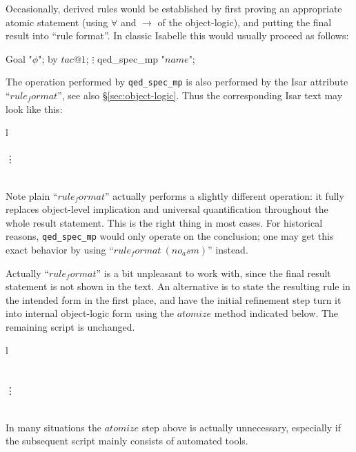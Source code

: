 \medskip Occasionally, derived rules would be established by first proving an
appropriate atomic statement (using $\forall$ and $\longrightarrow$ of the
object-logic), and putting the final result into ``rule format''.  In classic
Isabelle this would usually proceed as follows:
\begin{ttbox}
 Goal "\(\phi\)";
 by \(tac@1\);
   \(\vdots\)
 qed_spec_mp "\(name\)";
\end{ttbox}
The operation performed by \texttt{qed_spec_mp} is also performed by the Isar
attribute ``$rule_format$'', see also \S\ref{sec:object-logic}.  Thus the
corresponding Isar text may look like this:
\begin{matharray}{l}
   \\
  \quad {} \\
  \qquad \vdots \\
  \quad \DONE \\
\end{matharray}
Note plain ``$rule_format$'' actually performs a slightly different operation:
it fully replaces object-level implication and universal quantification
throughout the whole result statement.  This is the right thing in most cases.
For historical reasons, \texttt{qed_spec_mp} would only operate on the
conclusion; one may get this exact behavior by using
``$rule_format~(no_asm)$'' instead.

\medskip Actually ``$rule_format$'' is a bit unpleasant to work with, since
the final result statement is not shown in the text.  An alternative is to
state the resulting rule in the intended form in the first place, and have the
initial refinement step turn it into internal object-logic form using the
$atomize$ method indicated below.  The remaining script is unchanged.

\begin{matharray}{l}
   \\
  \quad {} \\
  \quad {} \\
  \qquad \vdots \\
  \quad \DONE \\
\end{matharray}

In many situations the $atomize$ step above is actually unnecessary,
especially if the subsequent script mainly consists of automated tools.


